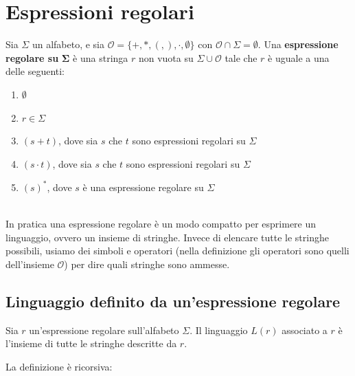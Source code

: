\section{Espressioni regolari} \label{regex}
\colorbox{SALZO}{\parbox{\dimexpr\linewidth-2\fboxsep}{\begin{definition}
   Sia $\Sigma $ un alfabeto, e sia $\mathcal{O} = \{ +,*,(,), \cdot , \emptyset   \}$ con $\mathcal{O}\cap \Sigma = \emptyset$.
   Una \textbf{espressione regolare su} $\bm{\Sigma}$ è una stringa $r$ non vuota su $\Sigma \cup \mathcal{O}$ tale che $r$ è uguale 
   a una delle seguenti:
   \begin{enumerate}
    \item $\emptyset$
    \item $r \in \Sigma$
    \item $(s+t)$, dove sia $s$ che $t$ sono espressioni regolari su $\Sigma$
    \item $(s\cdot t)$, dove sia $s$ che $t$ sono espressioni regolari su $\Sigma$
    \item $(s)^*$, dove $s$ è una espressione regolare su $\Sigma$
   \end{enumerate}
\end{definition}}}\smallskip\\
In pratica una espressione regolare è un modo compatto per esprimere un linguaggio, ovvero un insieme di stringhe.
Invece di elencare tutte le stringhe possibili, usiamo dei simboli e operatori (nella definizione gli operatori sono quelli dell'insieme $\mathcal{O}$) per dire quali stringhe sono ammesse.

\subsection{Linguaggio definito da un'espressione regolare}

Sia $r$ un'espressione regolare sull'alfabeto $\Sigma$.
Il linguaggio $L(r)$ associato a $r$ è l'insieme di tutte le stringhe descritte da $r$.

La definizione è ricorsiva:


